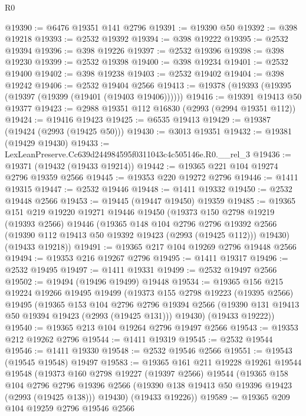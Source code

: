 \begin{lexlean}{R0}
\begin{coremodule}
@19390 := @6476 @19351 @141 @2796
@19391 := @19390 @50
@19392 := @398 @19218
@19393 := @2532 @19392
@19394 := @398 @19222
@19395 := @2532 @19394
@19396 := @398 @19226
@19397 := @2532 @19396
@19398 := @398 @19230
@19399 := @2532 @19398
@19400 := @398 @19234
@19401 := @2532 @19400
@19402 := @398 @19238
@19403 := @2532 @19402
@19404 := @398 @19242
@19406 := @2532 @19404 @2566
@19413 := @19378 (@19393 (@19395 (@19397 (@19399 (@19401 (@19403 @19406))))))
@19416 := @19391 @19413 @50 @19377
@19423 := @2988 @19351 @112 @16830 (@2993 (@2994 @19351 @112))
@19424 := @19416 @19423
@19425 := @6535 @19413
@19429 := @19387 (@19424 (@2993 (@19425 @50)))
@19430 := @3013 @19351
@19432 := @19381 (@19429 @19430)
@19433 := LexLeanPreserve.Cc639d244984595f0311043c4c505146e.R0.__rel_3
@19436 := @19371 (@19432 (@19433 @19214))
@19442 := @19365 @221 @104 @19274 @2796 @19359 @2566
@19445 := @19353 @220 @19272 @2796
@19446 := @1411 @19315
@19447 := @2532 @19446
@19448 := @1411 @19332
@19450 := @2532 @19448 @2566
@19453 := @19445 (@19447 @19450) @19359
@19485 := @19365
    @151
    @219
    @19220
    @19271
    @19446
    @19450
    (@19373
      @150
      @2798
      @19219
      (@19393 @2566)
      @19446
      (@19365
        @148
        @104
        @2796
        @2796
        @19392
        @2566
        (@19390 @112 @19413 @50 @19392 @19423 (@2993 (@19425 @112)))
        @19430)
      (@19433 @19218))
@19491 := @19365 @217 @104 @19269 @2796 @19448 @2566
@19494 := @19353 @216 @19267 @2796
@19495 := @1411 @19317
@19496 := @2532 @19495
@19497 := @1411 @19331
@19499 := @2532 @19497 @2566
@19502 := @19494 (@19496 @19499) @19448
@19534 := @19365
    @156
    @215
    @19224
    @19266
    @19495
    @19499
    (@19373
      @155
      @2798
      @19223
      (@19395 @2566)
      @19495
      (@19365
        @153
        @104
        @2796
        @2796
        @19394
        @2566
        (@19390 @131 @19413 @50 @19394 @19423 (@2993 (@19425 @131)))
        @19430)
      (@19433 @19222))
@19540 := @19365 @213 @104 @19264 @2796 @19497 @2566
@19543 := @19353 @212 @19262 @2796
@19544 := @1411 @19319
@19545 := @2532 @19544
@19546 := @1411 @19330
@19548 := @2532 @19546 @2566
@19551 := @19543 (@19545 @19548) @19497
@19583 := @19365
    @161
    @211
    @19228
    @19261
    @19544
    @19548
    (@19373
      @160
      @2798
      @19227
      (@19397 @2566)
      @19544
      (@19365
        @158
        @104
        @2796
        @2796
        @19396
        @2566
        (@19390 @138 @19413 @50 @19396 @19423 (@2993 (@19425 @138)))
        @19430)
      (@19433 @19226))
@19589 := @19365 @209 @104 @19259 @2796 @19546 @2566

\end{coremodule}
\end{lexlean}
